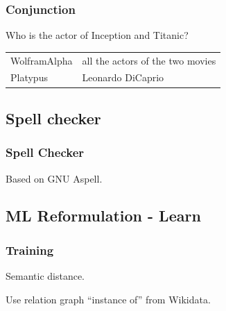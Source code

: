 \begin{frame}[fragile]
    \frametitle{Conjunction}

Who is the actor of Inception and Titanic?
    \begin{tabular}{ll}
        \alert{WolframAlpha} & all the actors of the two movies\\
        \alert{Platypus} & Leonardo DiCaprio\\
    \end{tabular}
\end{frame}

\subsection{Spell checker}

\begin{frame}[fragile]
    \frametitle{Spell Checker}
    Based on \alert{GNU Aspell}.

    \medbreak


    \medbreak

\end{frame}

\subsection{ML Reformulation - Learn}

\begin{frame}
\frametitle{Training}
\alert{Semantic distance.}

Use relation graph ``instance of'' from Wikidata.
\end{frame} 
\fi
